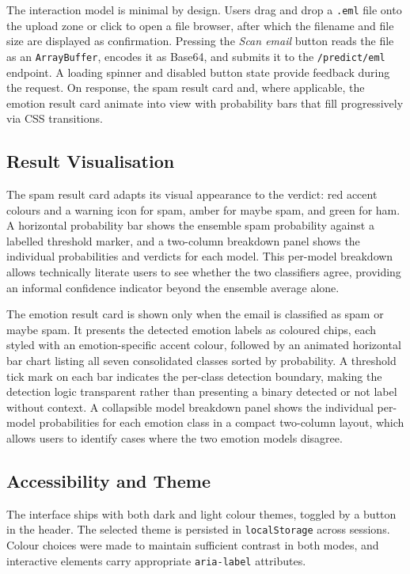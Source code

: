 The interaction model is minimal by design. Users drag and drop a \texttt{.eml} file onto the upload zone or click to open a file browser, after which the filename and file size are displayed as confirmation. Pressing the \textit{Scan email} button reads the file as an \texttt{ArrayBuffer}, encodes it as Base64, and submits it to the \texttt{/predict/eml} endpoint. A loading spinner and disabled button state provide feedback during the request. On response, the spam result card and, where applicable, the emotion result card animate into view with probability bars that fill progressively via CSS transitions.

\subsection{Result Visualisation}

The spam result card adapts its visual appearance to the verdict: red accent colours and a warning icon for spam, amber for maybe spam, and green for ham. A horizontal probability bar shows the ensemble spam probability against a labelled threshold marker, and a two-column breakdown panel shows the individual probabilities and verdicts for each model. This per-model breakdown allows technically literate users to see whether the two classifiers agree, providing an informal confidence indicator beyond the ensemble average alone.

The emotion result card is shown only when the email is classified as spam or maybe spam. It presents the detected emotion labels as coloured chips, each styled with an emotion-specific accent colour, followed by an animated horizontal bar chart listing all seven consolidated classes sorted by probability. A threshold tick mark on each bar indicates the per-class detection boundary, making the detection logic transparent rather than presenting a binary detected or not label without context. A collapsible model breakdown panel shows the individual per-model probabilities for each emotion class in a compact two-column layout, which allows users to identify cases where the two emotion models disagree.

\subsection{Accessibility and Theme}

The interface ships with both dark and light colour themes, toggled by a button in the header. The selected theme is persisted in \texttt{localStorage} across sessions. Colour choices were made to maintain sufficient contrast in both modes, and interactive elements carry appropriate \texttt{aria-label} attributes.

